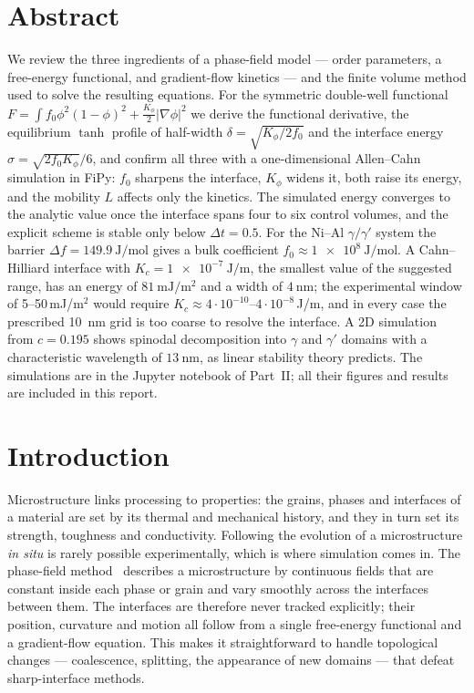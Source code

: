 \documentclass[11pt,a4paper]{article}
\numberwithin{equation}{section}
\theoremstyle{remark}
\begin{document}
\section*{Abstract}
  We review the three ingredients of a phase-field model --- order parameters, a free-energy
  functional, and gradient-flow kinetics --- and the finite volume method used to solve the resulting
  equations. For the symmetric double-well functional
  $F = \int f_0\phi^2(1-\phi)^2 + \tfrac{K_\phi}{2}|\nabla\phi|^2$ we derive the functional derivative,
  the equilibrium $\tanh$ profile of half-width $\delta = \sqrt{K_\phi/2f_0}$ and the interface energy
  $\sigma = \sqrt{2f_0K_\phi}/6$, and confirm all three with a one-dimensional Allen--Cahn simulation in
  FiPy: $f_0$ sharpens the interface, $K_\phi$ widens it, both raise its energy, and the mobility $L$
  affects only the kinetics. The simulated energy converges to the analytic value once the interface
  spans four to six control volumes, and the explicit scheme is stable only below $\Delta t = 0.5$. For
  the Ni--Al $\gamma/\gamma'$ system the barrier $\Delta f = \SI{149.9}{\joule\per\mole}$ gives a bulk
  coefficient $f_0 \approx \SI{1e8}{\joule\per\mole}$. A Cahn--Hilliard interface with
  $K_c = \SI{1e-7}{\joule\per\metre}$, the smallest value of the suggested range, has an energy of
  $\SI{81}{\milli\joule\per\metre\squared}$ and a width of $\SI{4}{\nano\metre}$; the experimental
  window of 5--50\,mJ/m$^2$ would require $K_c \approx 4\cdot10^{-10}$--$4\cdot10^{-8}$\,J/m, and in
  every case the prescribed \SI{10}{\nano\metre} grid is too coarse to resolve the interface. A 2D
  simulation from $c = 0.195$ shows spinodal decomposition into $\gamma$ and $\gamma'$ domains with a
  characteristic wavelength of $\SI{13}{\nano\metre}$, as linear stability theory predicts. The
  simulations are in the Jupyter notebook of Part~II; all their figures and results are included in
  this report.

\tableofcontents
\clearpage

\section{Introduction}\label{sec:intro}

Microstructure links processing to properties: the grains, phases and interfaces of a material are
set by its thermal and mechanical history, and they in turn set its strength, toughness and
conductivity. Following the evolution of a microstructure \emph{in situ} is rarely possible
experimentally, which is where simulation comes in. The phase-field method~\citep{script5,
chen2002, provatas2010} describes a microstructure by continuous fields that are constant inside each
phase or grain and vary smoothly across the interfaces between them. The interfaces are therefore
never tracked explicitly; their position, curvature and motion all follow from a single free-energy
functional and a gradient-flow equation. This makes it straightforward to handle topological changes
--- coalescence, splitting, the appearance of new domains --- that defeat sharp-interface methods.
\end{document}
